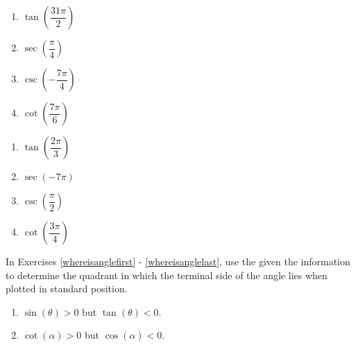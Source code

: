 \documentclass{ximera}
\begin{document}
\begin{multicols}{4}

\begin{enumerate}

\setcounter{enumi}{\value{HW}}

\item $\tan \left( \dfrac{31\pi}{2} \right)$
\item $\sec \left( \dfrac{\pi}{4} \right)$ 
\item $\csc \left( -\dfrac{7\pi}{4} \right)$
\item $\cot \left( \dfrac{7\pi}{6} \right)$

\setcounter{HW}{\value{enumi}}

\end{enumerate}

\end{multicols}

\begin{multicols}{4}

\begin{enumerate}

\setcounter{enumi}{\value{HW}}

\item $\tan \left( \dfrac{2\pi}{3} \right)$
\item $\sec \left( -7\pi \right)$ 
\item $\csc \left( \dfrac{\pi}{2} \right)$ 
\item $\cot \left( \dfrac{3\pi}{4} \right)$ \label{circvaluelast}

\setcounter{HW}{\value{enumi}}

\end{enumerate}

\end{multicols}

In Exercises \ref{whereisanglefirst} - \ref{whereisanglelast}, use the given the information to determine the quadrant in which the terminal side of the angle lies when plotted in standard position.

\begin{multicols}{2}
\begin{enumerate}
\setcounter{enumi}{\value{HW}}

\item  \label{whereisanglefirst} $\sin(\theta) > 0$ but $\tan(\theta) < 0$.

\item  $\cot(\alpha) > 0$ but $\cos(\alpha) < 0$.

\setcounter{HW}{\value{enumi}}
\end{enumerate}
\end{multicols}
\end{document}
